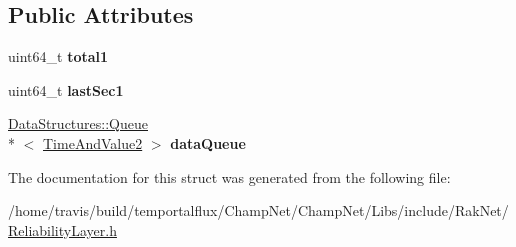 \subsection*{Public Attributes}
\begin{DoxyCompactItemize}
\item 
\hypertarget{struct_rak_net_1_1_b_p_s_tracker_a0c71bf403bc859674d9afc1498f9bf82}{uint64\-\_\-t {\bfseries total1}}\label{struct_rak_net_1_1_b_p_s_tracker_a0c71bf403bc859674d9afc1498f9bf82}

\item 
\hypertarget{struct_rak_net_1_1_b_p_s_tracker_abe567a8710273013448393c32ef112ad}{uint64\-\_\-t {\bfseries last\-Sec1}}\label{struct_rak_net_1_1_b_p_s_tracker_abe567a8710273013448393c32ef112ad}

\item 
\hypertarget{struct_rak_net_1_1_b_p_s_tracker_a3e27f087564063469e650a7fa6ff7322}{\hyperlink{class_data_structures_1_1_queue}{Data\-Structures\-::\-Queue}\\*
$<$ \hyperlink{struct_rak_net_1_1_b_p_s_tracker_1_1_time_and_value2}{Time\-And\-Value2} $>$ {\bfseries data\-Queue}}\label{struct_rak_net_1_1_b_p_s_tracker_a3e27f087564063469e650a7fa6ff7322}

\end{DoxyCompactItemize}


The documentation for this struct was generated from the following file\-:\begin{DoxyCompactItemize}
\item 
/home/travis/build/temportalflux/\-Champ\-Net/\-Champ\-Net/\-Libs/include/\-Rak\-Net/\hyperlink{_reliability_layer_8h}{Reliability\-Layer.\-h}\end{DoxyCompactItemize}
